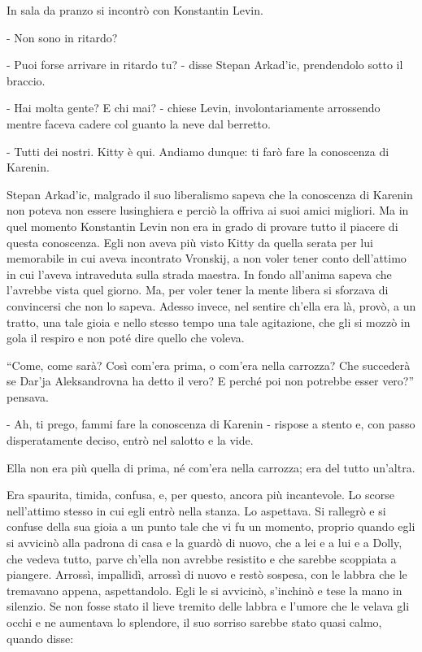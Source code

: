 In sala da pranzo si incontrò con Konstantin Levin. 

- Non sono in ritardo? 

- Puoi forse arrivare in ritardo tu? - disse Stepan Arkad'ic, prendendolo sotto il braccio. 

- Hai molta gente? E chi mai? - chiese Levin, involontariamente arrossendo mentre faceva cadere col guanto la neve dal berretto. 

- Tutti dei nostri. Kitty è qui. Andiamo dunque: ti farò fare la conoscenza di Karenin. 

Stepan Arkad'ic, malgrado il suo liberalismo sapeva che la conoscenza di Karenin non poteva non essere lusinghiera e perciò la offriva ai suoi amici migliori. Ma in quel momento Konstantin Levin non era in grado di provare tutto il piacere di questa conoscenza. Egli non aveva più visto Kitty da quella serata per lui memorabile in cui aveva incontrato Vronskij, a non voler tener conto dell'attimo in cui l'aveva intraveduta sulla strada maestra. In fondo all'anima sapeva che l'avrebbe vista quel giorno. Ma, per voler tener la mente libera si sforzava di convincersi che non lo sapeva. Adesso invece, nel sentire ch'ella era là, provò, a un tratto, una tale gioia e nello stesso tempo una tale agitazione, che gli si mozzò in gola il respiro e non poté dire quello che voleva. 

``Come, come sarà? Così com'era prima, o com'era nella carrozza? Che succederà se Dar'ja Aleksandrovna ha detto il vero? E perché poi non potrebbe esser vero?'' pensava. 

- Ah, ti prego, fammi fare la conoscenza di Karenin - rispose a stento e, con passo disperatamente deciso, entrò nel salotto e la vide. 

Ella non era più quella di prima, né com'era nella carrozza; era del tutto un'altra. 

Era spaurita, timida, confusa, e, per questo, ancora più incantevole. Lo scorse nell'attimo stesso in cui egli entrò nella stanza. Lo aspettava. Si rallegrò e si confuse della sua gioia a un punto tale che vi fu un momento, proprio quando egli si avvicinò alla padrona di casa e la guardò di nuovo, che a lei e a lui e a Dolly, che vedeva tutto, parve ch'ella non avrebbe resistito e che sarebbe scoppiata a piangere. Arrossì, impallidì, arrossì di nuovo e restò sospesa, con le labbra che le tremavano appena, aspettandolo. Egli le si avvicinò, s'inchinò e tese la mano in silenzio. Se non fosse stato il lieve tremito delle labbra e l'umore che le velava gli occhi e ne aumentava lo splendore, il suo sorriso sarebbe stato quasi calmo, quando disse: 
\enlargethispage*{1\baselineskip}

